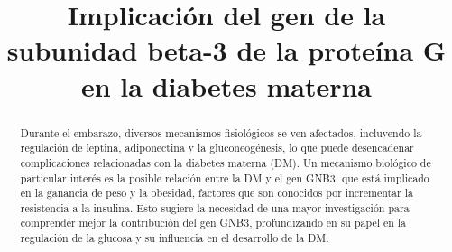 \documentclass{bmcart}
\begin{document}
	\begin{frontmatter}
	
		\begin{fmbox}
			
			
			\title{Implicación del gen de la subunidad beta-3 de la proteína G en la diabetes materna}
			
			
			\author[
			  addressref={aff1},                   %
			  corref={aff1},                       %
			  email={victorgo@uma.es}   %
			]{ } %
			\author[
			  addressref={aff2},
			  email={susanafernandez@uma.es}
			]{ }
			\author[
			addressref={aff3},
			email={pablobermudezgamez@uma.es}
			]{ }
			\author[
			addressref={aff4},
			email={juancavergara6@uma.es}
			]{ }
			
			
			\address[id=aff1]{%
			  ,             %
			  ,          %
			  ,                              %
			}
		
		\end{fmbox}%
		
		\begin{abstractbox}
		
			\begin{abstract} %
			
			
			Durante el embarazo, diversos mecanismos fisiológicos se ven afectados, incluyendo la regulación de leptina, adiponectina y la gluconeogénesis, lo que puede desencadenar complicaciones relacionadas con la diabetes materna (DM). Un mecanismo biológico de particular interés es la posible relación entre la DM y el gen GNB3, que está implicado en la ganancia de peso y la obesidad, factores que son conocidos por incrementar la resistencia a la insulina. Esto sugiere la necesidad de una mayor investigación para comprender mejor la contribución del gen GNB3, profundizando en su papel en la regulación de la glucosa y su influencia en el desarrollo de la DM.
			

\end{abstract}
\end{abstractbox}
\end{frontmatter}
\end{document}
